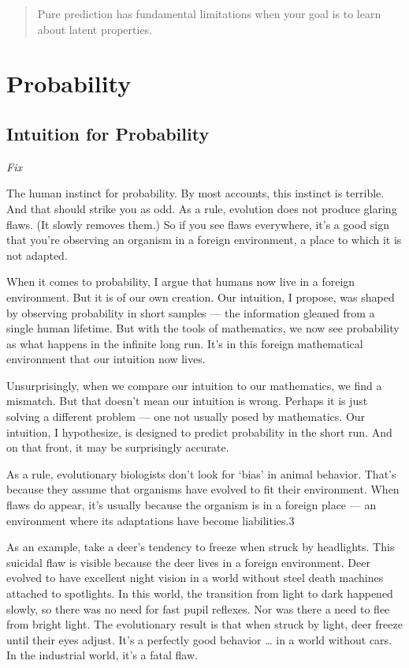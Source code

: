 \documentclass[
]{book}
\begin{document}
\begin{quote}
Pure prediction has fundamental limitations when your goal is to learn about latent properties.
\end{quote}

\hypertarget{probability}{%
\chapter{Probability}\label{probability}}

\hypertarget{intuition-for-probability}{%
\section{Intuition for Probability}\label{intuition-for-probability}}

\emph{Fix}

The human instinct for probability. By most accounts, this instinct is terrible. And that should strike you as odd. As a rule, evolution does not produce glaring flaws. (It slowly removes them.) So if you see flaws everywhere, it's a good sign that you're observing an organism in a foreign environment, a place to which it is not adapted.

When it comes to probability, I argue that humans now live in a foreign environment. But it is of our own creation. Our intuition, I propose, was shaped by observing probability in short samples --- the information gleaned from a single human lifetime. But with the tools of mathematics, we now see probability as what happens in the infinite long run. It's in this foreign mathematical environment that our intuition now lives.

Unsurprisingly, when we compare our intuition to our mathematics, we find a mismatch. But that doesn't mean our intuition is wrong. Perhaps it is just solving a different problem --- one not usually posed by mathematics. Our intuition, I hypothesize, is designed to predict probability in the short run. And on that front, it may be surprisingly accurate.

As a rule, evolutionary biologists don't look for `bias' in animal behavior. That's because they assume that organisms have evolved to fit their environment. When flaws do appear, it's usually because the organism is in a foreign place --- an environment where its adaptations have become liabilities.3

As an example, take a deer's tendency to freeze when struck by headlights. This suicidal flaw is visible because the deer lives in a foreign environment. Deer evolved to have excellent night vision in a world without steel death machines attached to spotlights. In this world, the transition from light to dark happened slowly, so there was no need for fast pupil reflexes. Nor was there a need to flee from bright light. The evolutionary result is that when struck by light, deer freeze until their eyes adjust. It's a perfectly good behavior \ldots{} in a world without cars. In the industrial world, it's a fatal flaw.
\end{document}
